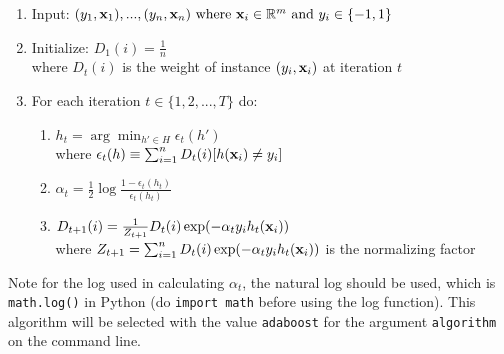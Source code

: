 \documentclass[11pt]{article}
\newcommand{\vx}{{\bf x}}
\newcommand{\vxi}{{\bf x}_i}
\newcommand{\vxn}{{\bf x}_n}
\newcommand{\code}[1]{{\footnotesize \tt #1}}
\begin{document}
	\begin{enumerate}
		\item Input: $(y_1,\vx_1),...,(y_n,\vxn) \text{ where } \vxi \in \mathbb{R}^m \text{ and } y_i \in \{-1, 1\} $
		\item Initialize: $D_1(i) = \frac{1}{n}$ \\
		where  $D_t(i)$ is the weight of instance $(y_i,\vxi)$ at iteration $t$
		\item For each iteration $t \in \{1,2,...,T\}$ do:
		\begin{enumerate}
			\item $h_t = \arg \min_{h' \in H} \epsilon_t(h')$ \\
			where $\epsilon_t(h) \equiv \sum_{i=1}^n { D_t(i) [ h(\vxi) \neq y_i ] }$
			
			\item $\alpha_t = \frac{1}{2} \log{ \frac{1-\epsilon_t(h_t)}{\epsilon_t(h_t)} }$
			\item $D_{t+1}(i) = \frac{1}{Z_{t+1}} D_t(i) \exp( -\alpha_t y_i h_t(\vxi) ) $ \\
			where $Z_{t+1} = \sum_{i=1}^n D_t(i) \exp( -\alpha_t y_i h_t(\vxi) )$ is the normalizing factor \\
		\end{enumerate}
	\end{enumerate}
	
	Note for the log used in calculating $\alpha_t$, the natural log should be used, which is \code{math.log()} in Python (do \code{import math} before using the log function). This algorithm will be selected with the value \code{adaboost} for the argument \code{algorithm} on the command line.
	
	
\end{document}
